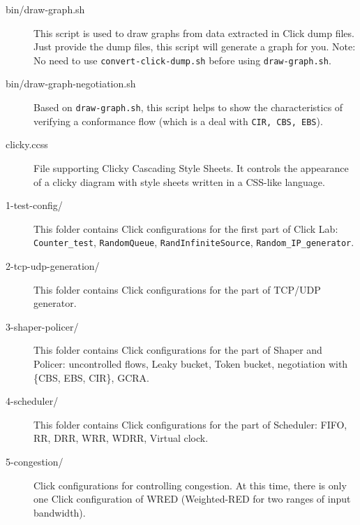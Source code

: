 \documentclass[a4paper]{article}
\begin{document}
\begin{description}
      	\item[bin/draw-graph.sh] This script is used to draw graphs from data extracted in Click dump files. Just provide the dump files, this script will generate a graph for you. Note: No need to use \texttt{convert-click-dump.sh} before using \texttt{draw-graph.sh}.
      	\item[bin/draw-graph-negotiation.sh] Based on \texttt{draw-graph.sh}, this script helps to show the characteristics of verifying a conformance flow (which is a deal with \texttt{CIR, CBS, EBS}).
      	\item[clicky.ccss] File supporting Clicky Cascading Style Sheets. It controls the appearance of a clicky diagram with style sheets written in a CSS-like language.      	
      	\item[1-test-config/] This folder contains Click configurations for the first part of Click Lab: \texttt{Counter\_test}, \texttt{RandomQueue}, \texttt{RandInfiniteSource}, \texttt{Random\_IP\_generator}.
      	\item[2-tcp-udp-generation/] This folder contains Click configurations for the part of TCP/UDP generator.
      	\item[3-shaper-policer/] This folder contains Click configurations for the part of Shaper and Policer: uncontrolled flows, Leaky bucket, Token bucket, negotiation with \{CBS, EBS, CIR\}, GCRA.
      	\item[4-scheduler/] This folder contains Click configurations for the part of Scheduler: FIFO, RR, DRR, WRR, WDRR, Virtual clock.
      	\item[5-congestion/] Click configurations for controlling congestion. At this time, there is only one Click configuration of WRED (Weighted-RED for two ranges of input bandwidth).
      \end{description}
    
\end{document}

